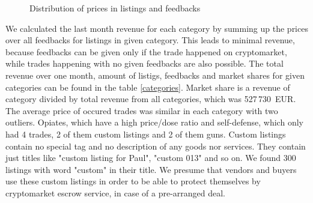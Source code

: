\documentclass[
  digital, %
  table,   %
  lof,     %
  lot,     %
  oneside
]{fithesis3}
\begin{document}
\begin{figure}[!htb]
    
\caption{Distribution of prices in listings and feedbacks}
\end{figure}

We calculated the last month revenue for each category
by summing up the prices over all feedbacks for listings in given category.
This leads to minimal revenue, because feedbacks
can be given only if the trade happened on cryptomarket, while 
trades happening with no given feedbacks are also possible.
The total revenue over one month, amount of listigs, feedbacks and market shares for given categories 
can be found in the table \ref{categories}.
Market share is a revenue of category divided by total revenue from all categories, which was 527\,730~EUR.
The average price of occured trades was similar in each category
with two outliers. Opiates, which have a high price/dose ratio and 
self-defense, which only had 4 trades, 2 of them custom listings and 2 of them guns.
Custom listings contain no special tag and no description of any goods nor services.
They contain just titles like "custom listing for Paul", "custom 013" and so on.
We found 300 listings with word "custom" in their title. 
We presume that vendors and buyers use these custom listings in order to be able to protect themselves
by cryptomarket escrow service, in case of a pre-arranged deal.
\end{document}
